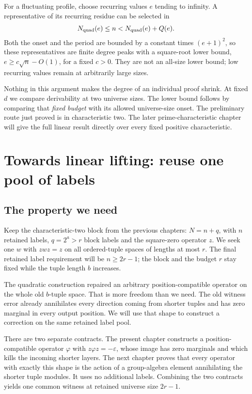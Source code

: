 \documentclass[11pt,a4paper,oneside,openany]{book}
\theoremstyle{definition}\newtheorem{definition}[theorem]{Definition}
\theoremstyle{remark}\newtheorem{remark}[theorem]{Remark}
\numberwithin{equation}{chapter}
\begin{document}
For a fluctuating profile, choose recurring values $e$ tending to
infinity. A representative of its recurring residue can be selected
in
\[
       N_{\rm quad}(e)\le n<N_{\rm quad}(e)+Q(e).
\]
Both the onset and the period are bounded by a constant times
$(e+1)^2$, so these representatives are finite degree peaks with a square-root lower bound, $e\ge c\sqrt n-O(1)$, for a fixed $c>0$. They are not an
all-size lower bound; low recurring values remain at arbitrarily
large sizes.

Nothing in this argument makes the degree of an individual proof
shrink. At fixed $d$ we compare derivability at two universe sizes.
The lower bound follows by comparing that \emph{fixed budget} with
its allowed universe-size onset. The preliminary route just proved
is in characteristic two. The later prime-characteristic chapter
will give the full linear result directly over every fixed positive
characteristic.

\chapter{Towards linear lifting: reuse one pool of labels}\label{tx:sec:linear-construction}
\label{tx:ch:linear-layers}
\section*{The property we need}
Keep the characteristic-two block from the previous chapters:
$N=n+q$, with $n$ retained labels, $q=2^a>r$ block labels and
the square-zero operator $z$. We seek one $w$ with $zwz=z$ on
all ordered-tuple spaces of lengths at most $r$. The final retained
label requirement will be $n\ge2r-1$; the block and the budget $r$
stay fixed while the tuple length $b$ increases.

The quadratic construction repaired an arbitrary position-compatible
operator on the whole old $b$-tuple space. That is more freedom than
we need. The old witness error already annihilates every direction
coming from shorter tuples and has zero marginal in every output
position. We will use that shape to construct a correction on the
same retained label pool.

There are two separate contracts. The present chapter constructs a
position-compatible operator $\varphi$ with $z\varphi z=-\varepsilon$,
whose image has zero marginals and which kills the incoming shorter
layers. The next chapter proves that every operator with exactly
this shape is the action of a group-algebra element annihilating the
shorter tuple modules. It uses no additional labels. Combining the
two contracts yields one common witness at retained universe size $2r-1$.
\end{document}
